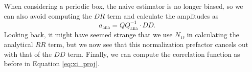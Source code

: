 \documentclass[modern]{aastex62}
\newcommand{\inv}{^{-1}}
\begin{document}
When considering a periodic box, the naive estimator is no longer biased, so we can also avoid computing the $DR$ term and calculate the amplitudes as 
\begin{equation}
a_{\mathrm{ana}} = QQ_\mathrm{ana} \inv \cdot DD.
\end{equation}
Looking back, it might have seemed strange that we use $N_D$ in calculating the analytical $RR$ term, but we now see that this normalization prefactor cancels out with that of the $DD$ term.
Finally, we can compute the correlation function as before in Equation \ref{eq:xi_proj}.

% 
%

\end{document}
